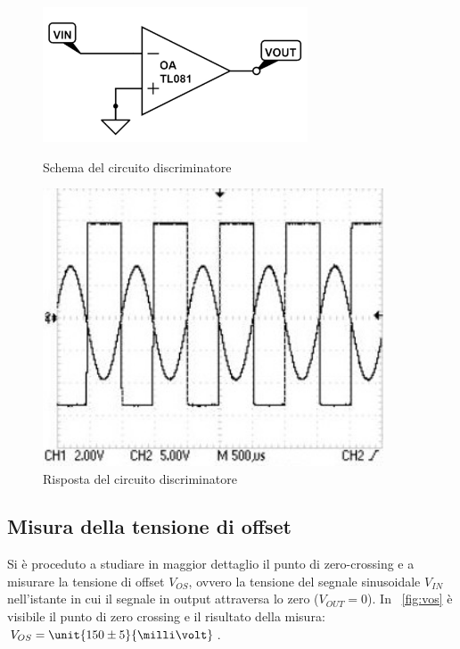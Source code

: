 \documentclass[10pt,a4paper]{article}
\begin{document}
\begin{figure}[H]
	\begin{minipage}{0.49\textwidth}
		\centering
		\includegraphics[width=0.7\textwidth]{../circuiti/discriminatore.jpg}
		\caption{Schema del circuito discriminatore}
		\label{circuito_discriminatore}
	\end{minipage}
	\begin{minipage}{0.49\textwidth}
		\centering
		\includegraphics[width=0.9\textwidth]{../oscilloscopio/discriminator.jpg}
		\caption{Risposta del circuito discriminatore}
		\label{fig:discriminator}
	\end{minipage}
\end{figure}

\subsection{Misura della tensione di offset}
Si è proceduto a studiare in maggior dettaglio il punto di zero-crossing e a misurare la tensione di offset $V_{OS}$, ovvero la tensione del segnale sinusoidale $V_{IN}$ nell'istante in cui il segnale in output attraversa lo zero ($V_{OUT}=0$). In \figurename{~\ref{fig:vos}} è visibile il punto di zero crossing e il risultato della misura: $V_{OS} = \unit{150 \pm 5}{\milli\volt}$.
\end{document}
